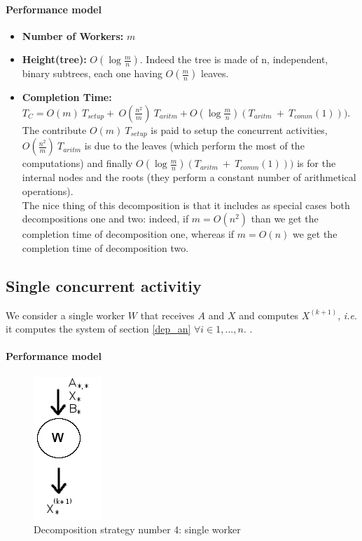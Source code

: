 \documentclass{article}
\begin{document}
\paragraph{Performance model}
\begin{itemize}
\item \textbf{Number of Workers:} $m$
\item \textbf{Height(tree):} $O(\log \frac{m}{n})$. Indeed the tree is made of n, independent, binary subtrees, each one having $O(\frac{m}{n})$ leaves.
\item \textbf{Completion Time:} $T_{C} = O(m) \: T_{setup} + \: O( \frac{n^2}{m}) \: T_{aritm} + O(\log \frac{m}{n})(T_{aritm} \: + \: T_{comm}(1)) )$. The contribute $O(m) \: T_{setup}$ is paid to setup the concurrent activities, $O( \frac{n^2}{m}) \: T_{aritm}$ is due to the leaves (which perform the most of the computations) and finally $O(\log \frac{m}{n})(T_{aritm} \: + \: T_{comm}(1)) )$ is for the internal nodes and the roots (they perform a constant number of arithmetical operations). \\ 
The nice thing of this decomposition is that it includes as special cases both decompositions one and two: indeed, if $m = O(n^2)$ than we get the completion time of decomposition one, whereas if $m = O(n)$ we get the completion time of decomposition two. 
\end{itemize}

\subsection{Single concurrent activitiy}
We consider a single worker $W$ that receives $A$ and $X$ and computes $X^{(k+1)}$, \textit{i.e.} it computes the system of section \ref{dep_an} $\forall i \in 1, ... , n $. .
\paragraph{Performance model} 

\begin{figure}[h]
\centering
\includegraphics[scale=0.52]{single_worker_p3}
\caption{Decomposition strategy number 4: single worker}
\label{fig:worker}
\end{figure} 
\end{document}
